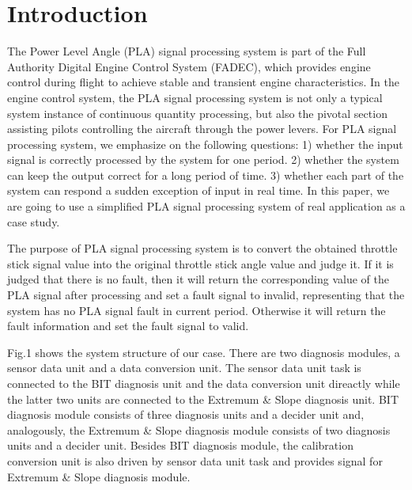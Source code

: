 
\section{Introduction}
\label{introduction}



The Power Level Angle (PLA) signal processing system is part of the Full Authority Digital Engine Control System (FADEC), 
 which provides engine control during flight to achieve stable and transient engine characteristics. 
 In the engine control system, the PLA signal processing system is not only a typical system instance of continuous quantity processing, but also the pivotal section assisting pilots controlling the aircraft through the power levers.
 For PLA signal processing system, we emphasize on the following questions: 1) whether the input signal is correctly processed by the system for one period. 2) whether the system can keep the output correct for a long period of time. 3) whether each part of the system can respond a sudden exception of input in real time.
 In this paper, we are going to use a simplified PLA signal processing system of real application as a case study. 
 
 The purpose of PLA signal processing system is to convert the obtained throttle stick signal value into the original throttle stick angle value and judge it. 
 If it is judged that there is no fault, then it will return the corresponding value of the PLA signal after processing and set a fault signal to invalid, 
 representing that the system has no PLA signal fault in current period. 
 Otherwise it will return the fault information and set the fault signal to valid.

Fig.1 shows the system structure of our case. There are two diagnosis modules, a sensor data unit and a data conversion unit. The sensor data unit task is connected to the BIT diagnosis unit and the data conversion unit direactly while the latter two units are connected to the Extremum \& Slope diagnosis unit. BIT diagnosis module consists of three diagnosis units and a decider unit and, analogously, the Extremum \& Slope diagnosis module consists of two diagnosis units and a decider unit. Besides BIT diagnosis module, the calibration conversion unit is also driven by sensor data unit task and provides signal for Extremum \& Slope diagnosis module.

